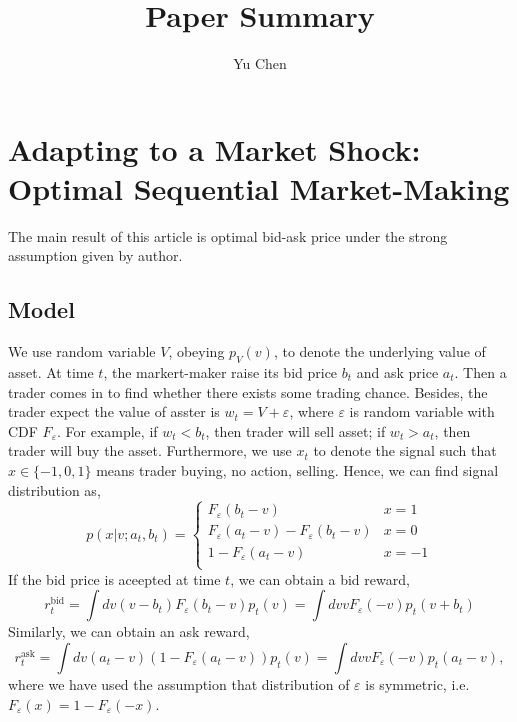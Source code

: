 \documentclass[11pt,a4paper]{article}
\title{Paper Summary}
\author{Yu Chen}
\affiliation{The Chinese University of HongKong, Department of Mechanical and Automation Engineering}
\def\epsilon{\varepsilon}
\begin{document}
\maketitle
\section{Adapting to a Market Shock: Optimal Sequential Market-Making}
The main result of this article is optimal bid-ask price under the strong assumption given by author.
\subsection{Model}
We use random variable $V$, obeying $p_V(v)$, to denote the underlying value of asset. At time $t$, the markert-maker raise its bid price $b_t$ and ask price $a_t$. Then a trader comes in to find whether there exists some trading chance. Besides, the trader expect the value of asster is $w_t = V + \epsilon$, where $\epsilon$ is random variable with CDF $F_{\epsilon}$. For example, if $w_t < b_t$, then trader will sell asset; if $w_t > a_t$, then trader will buy the asset. Furthermore, we use $x_t$ to denote the signal such that $x \in \{-1,0,1\}$ means trader buying, no action, selling. Hence, we can find signal distribution as,
\begin{equation}
p(x|v;a_t,b_t) = \left\{\begin{array}{cc} F_{\epsilon}(b_t-v) & x = 1\\   F_{\epsilon}(a_t - v)- F_{\epsilon}(b_t -v) &x= 0\\  1 - F_{\epsilon}(a_t -v) &x = -1\\ 
\end{array}\right.
\end{equation}
If the bid price is aceepted at time $t$, we can obtain a bid reward,
\begin{equation}
r_t^{\mathrm{bid}} = \int dv(v-b_t) F_{\epsilon}(b_t -v)p_t(v) = \int dv v F_{\epsilon}(-v)p_t(v+b_t)
\end{equation}
Similarly, we can obtain an ask reward,
\begin{equation}
r_t^{\mathrm{ask}} = \int dv(a_t -v)(1-F_{\epsilon}(a_t-v))p_t(v) = \int dv v F_{\epsilon}(-v)p_t(a_t-v),
\end{equation}
where we have used the assumption that distribution of $\epsilon$ is symmetric, i.e. $F_{\epsilon}(x) = 1 - F_{\epsilon}(-x)$.
\end{document}
